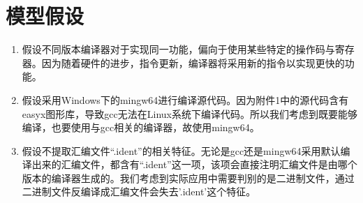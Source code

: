\section{模型假设}
\begin{enumerate}%
  \item 假设不同版本编译器对于实现同一功能，偏向于使用某些特定的操作码与寄存器。因为随着硬件的进步，指令更新，编译器将采用新的指令以实现更快的功能。
  \item 假设采用Windows下的mingw64进行编译源代码。因为附件1中的源代码含有easyx图形库，导致gcc无法在Linux系统下编译代码。所以我们考虑到既要能够编译，也要使用与gcc相关的编译器，故使用mingw64。
  \item 假设不提取汇编文件“.ident”的相关特征。无论是gcc还是mingw64采用默认编译出来的汇编文件，都含有“.ident”这一项，该项会直接注明汇编文件是由哪个版本的编译器生成的。我们考虑到实际应用中需要判别的是二进制文件，通过二进制文件反编译成汇编文件会失去'.ident'这个特征。
\end{enumerate}